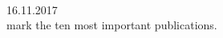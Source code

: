 \documentclass[12pt,a4]{report}
\begin{document}
\newcommand{\emp}[1]
{\it{#1}\rm}

\newenvironment{Body} %
 {\begin{list}{}{%
	\vspace{-0.6cm}
	\setlength{\leftmargin}{1.2cm}}
	  \item[]\ignorespaces}
 {\end{list}}


\vspace{-2cm}


 \\

 \hfill 16.11.2017\\


%
 mark the ten most important publications.
\vspace{0.3cm}


%

\vspace{0.3cm}





\vspace{0.4cm}

\end{document}
